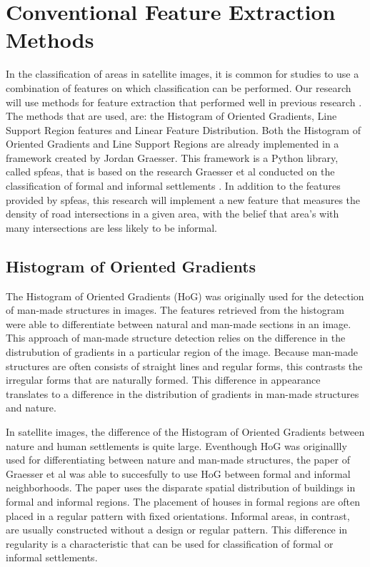 \section{Conventional Feature Extraction Methods}

In the classification of areas in satellite images, it is common for studies to use
a combination of features on which classification can be performed.
Our research will use methods for feature extraction that performed well in
previous research \cite{graesser2012image}. The methods that are used, are: the Histogram
of Oriented Gradients, Line Support Region features and Linear Feature
Distribution. Both the Histogram of Oriented Gradients and Line Support Regions
are already implemented in a framework created by Jordan Graesser. This
framework is a Python library, called spfeas, that is based on the
research Graesser et al conducted on the classification of formal and informal
settlements \cite{graesser2012image}. In addition to the features provided by
spfeas, this research will implement a new feature that measures the density of
road intersections in a given area, with the belief that area's with many
intersections are less likely to be informal.

\subsection{Histogram of Oriented Gradients}


The Histogram of Oriented Gradients (HoG) was originally used for the detection of
man-made structures in images. The features retrieved from the histogram were
able to differentiate between natural and man-made sections in an image. This
approach of man-made structure detection relies on the difference in the
distrubution of gradients in a particular region of the image. Because man-made
structures are often consists of straight lines and regular forms, this
contrasts the irregular forms that are naturally formed. This difference in
appearance translates to a difference in the distribution of gradients in
man-made structures and nature.

In satellite images, the difference of the Histogram of Oriented Gradients
between nature and human settlements is quite large. Eventhough HoG was
originallly used for differentiating between nature and man-made structures,
the paper of Graesser et al was able to succesfully to use HoG between formal
and informal neighborhoods. The paper uses the disparate spatial distribution of
buildings in formal and informal regions. The
placement of houses in formal regions are often placed in a regular pattern
with fixed orientations. Informal areas, in contrast, are usually constructed
without a design or regular pattern. This difference in regularity is
a characteristic that can be used for classification of formal or informal
settlements.

